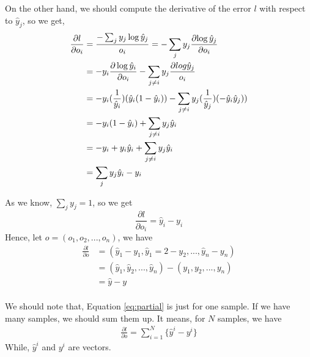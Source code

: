 \documentclass[a4paper]{article}
\begin{document}
On the other hand, we should compute the derivative of the error $l$ with respect to $\hat{y}_j$, so we get,
\begin{equation}
\begin{split}
\frac{\partial l}{\partial o_i} &= \frac{-\sum_{j}{y_j\log{\Hat{y}_j}}}{o_i} =-\sum_j{y_j \frac{\partial {\log{\hat{y}_j}}}{\partial o_i}}     \\
&=-y_i \frac{\partial \log{\hat{y}_i}}{\partial o_i} - \sum_{j\neq i}{y_j \frac{\partial log{\hat{y}_j}}{o_i}} \\
& = -y_i (\frac{1}{\hat{y}_i})(\hat{y}_i(1-\hat{y}_i)) - \sum_{j\neq i}{y_j(\frac{1}{\hat{y}_j})(-\hat{y}_i\hat{y}_j))} \\
&=-y_i(1-\hat{y}_i)+\sum_{j\neq i}{y_j\hat{y}_i} \\
&=-y_i + y_i\hat{y}_i + \sum_{j\neq i}{y_j\hat{y}_i} \\
&=\sum_j{y_j\hat{y}_i} - y_i \\
\end{split}    
\end{equation}

As we know, $\sum_j{y_j}=1$, so we get
\begin{equation}
\label{eq:partial}
\frac{\partial l}{\partial o_i} = \hat{y}_i - y_i    
\end{equation}
Hence, let $o=(o_1,o_2,...,o_n)$, we have
\begin{equation}
\begin{split}
\frac{\partial l}{\partial o} &= (\hat{y}_1 - y_1,\hat{y}_1=2 - y_2,...,\hat{y}_n - y_n) \\    
&= (\hat{y}_1,\hat{y}_2,...,\hat{y}_n)-(y_1,y_2,...,y_n) \\    
&=\hat{y}-y \\
\end{split}
\end{equation}

We should note that, Equation \ref{eq:partial} is just for one sample. If we have many samples, we should sum them up. It means, for $N$ samples, we have
\begin{equation}
\begin{split}
\frac{\partial l}{\partial o} = \sum_{i=1}^{N}\{\hat{y}^i - y^i\} 
\end{split}
\end{equation}
While, $\hat{y}^i$ and $y^i$ are vectors.



\end{document}
